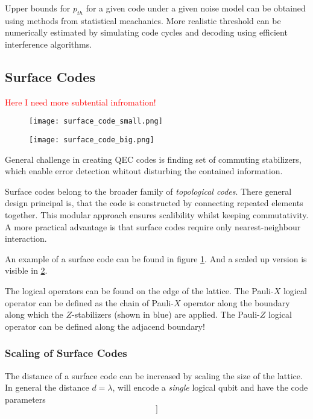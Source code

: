 Upper bounds for $p_{th}$ for a given code under a given noise model can be obtained using methods from statistical meachanics.
More realistic threshold can be numerically estimated by simulating code cycles and decoding using efficient interference algorithms. 

\subsection{Surface Codes}
\textcolor{red}{Here I need more subtential infromation!}
\begin{figure}[h]
    \begin{center}
        \texttt{[image: surface\_code\_small.png]}
    \end{center}
    \label{fig:basic.qc.surface_code_small}
\end{figure}
\begin{figure}[h]
    \begin{center}
        \texttt{[image: surface\_code\_big.png]}
    \end{center}
    \label{fig:basic.qc.surface_code_big}
\end{figure}
General challenge in creating QEC codes is finding set of commuting stabilizers, 
which enable error detection whitout disturbing the contained information.

Surface codes belong to the broader family of \textit{topological codes}.
There general design principal is, that the code is constructed by connecting repeated elements together. 
This modular approach ensures scalibility whilst keeping commutativity.
A more practical advantage is that surface codes require only nearest-neighbour interaction.

An example of a surface code can be found in figure \ref{fig:basic.qc.surface_code_small}.
And a scaled up version is visible in \ref{fig:basic.qc.surface_code_big}.

The logical operators can be found on the edge of the lattice. 
The Pauli-$X$ logical operator can be defined as the chain of Pauli-$X$ operator along the boundary along which the $Z$-stabilizers (shown in blue) are applied.
The Pauli-$Z$ logical operator can be defined along the adjacend boundary!

\subsubsection{Scaling of Surface Codes}
The distance of a surface code can be increased by scaling the size of the lattice.
In general the distance $d=\lambda$, will encode a \textit{single} logical qubit and have the code parameters
\begin{equation}
    [[n = \lambda^2 + (\lambda-1)^2, k=1 ]]
\end{equation}


